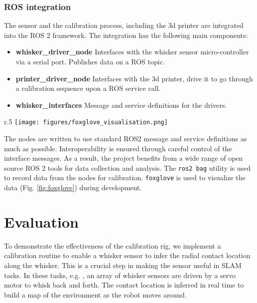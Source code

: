 \documentclass[runningheads]{llncs}
\begin{document}
\subsubsection{ROS integration}

The sensor and the calibration process, including the 3d printer are integrated into the ROS 2 framework. The integration has the following main components:

\begin{itemize}
    \item \textbf{whisker\_driver\_node} Interfaces with the whisker sensor micro-controller via a serial port. Publishes data on a ROS topic.
    \item \textbf{printer\_driver\_node} Interfaces with the 3d printer, drive it to go through a calibration sequence upon a ROS service call.
    \item \textbf{whisker\_interfaces} Message and service definitions for the drivers.
\end{itemize}

\begin{wrapfigure}{r}{.5\textwidth}
    \centering
    \texttt{[image: figures/foxglove\_visualisation.png]}
    \caption{Foxglove visualization of whisker sensor system running in ROS 2}
    \label{fig:foxglove}
\end{wrapfigure}

The nodes are written to use standard ROS2 message and service definitions as much as possible. Interoperability is ensured through careful control of the interface messages. As a result, the project benefits from a wide range of open source ROS 2 tools for data collection and analysis. The \verb|ros2 bag| utility is used to record data from the nodes for calibration. \verb|foxglove| is used to visualize the data (Fig. \ref{fig:foxglove}) during development.

\section{Evaluation}

To demonstrate the effectiveness of the calibration rig, we implement a calibration routine to enable a whisker sensor to infer the radial contact location along the whisker. This is a crucial step in making the sensor useful in SLAM tasks. In these tasks, e.g. \cite{pearsonSimultaneousLocalisationMapping2013} \cite{leporaNaiveBayesNovelty2010}, an array of whisker sensors are driven by a servo motor to whisk back and forth. The contact location is inferred in real time to build a map of the environment as the robot moves around.
\end{document}
